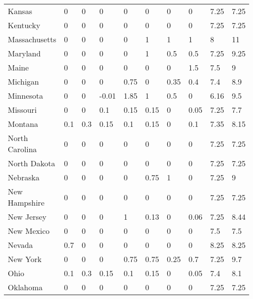 \begin{table}[H]
{{\begin{tabular}{@{}llllllllll@{}}
                Kansas         & 0    & 0    & 0     & 0    & 0    & 0    & 0    & 7.25     & 7.25   \\
                Kentucky       & 0    & 0    & 0     & 0    & 0    & 0    & 0    & 7.25     & 7.25   \\
                Massachusetts  & 0    & 0    & 0     & 0    & 1    & 1    & 1    & 8        & 11     \\
                Maryland       & 0    & 0    & 0     & 0    & 1    & 0.5  & 0.5  & 7.25     & 9.25   \\
                Maine          & 0    & 0    & 0     & 0    & 0    & 0    & 1.5  & 7.5      & 9      \\
                Michigan       & 0    & 0    & 0     & 0.75 & 0    & 0.35 & 0.4  & 7.4      & 8.9    \\
                Minnesota      & 0    & 0    & -0.01 & 1.85 & 1    & 0.5  & 0    & 6.16     & 9.5    \\
                Missouri       & 0    & 0    & 0.1   & 0.15 & 0.15 & 0    & 0.05 & 7.25     & 7.7    \\
                Montana        & 0.1  & 0.3  & 0.15  & 0.1  & 0.15 & 0    & 0.1  & 7.35     & 8.15   \\
                North Carolina & 0    & 0    & 0     & 0    & 0    & 0    & 0    & 7.25     & 7.25   \\
                North Dakota   & 0    & 0    & 0     & 0    & 0    & 0    & 0    & 7.25     & 7.25   \\
                Nebraska       & 0    & 0    & 0     & 0    & 0.75 & 1    & 0    & 7.25     & 9      \\
                New Hampshire  & 0    & 0    & 0     & 0    & 0    & 0    & 0    & 7.25     & 7.25   \\
                New Jersey     & 0    & 0    & 0     & 1    & 0.13 & 0    & 0.06 & 7.25     & 8.44   \\
                New Mexico     & 0    & 0    & 0     & 0    & 0    & 0    & 0    & 7.5      & 7.5    \\
                Nevada         & 0.7  & 0    & 0     & 0    & 0    & 0    & 0    & 8.25     & 8.25   \\
                New York       & 0    & 0    & 0     & 0.75 & 0.75 & 0.25 & 0.7  & 7.25     & 9.7    \\
                Ohio           & 0.1  & 0.3  & 0.15  & 0.1  & 0.15 & 0    & 0.05 & 7.4      & 8.1    \\
                Oklahoma       & 0    & 0    & 0     & 0    & 0    & 0    & 0    & 7.25     & 7.25   \\

\end{tabular}}}
\end{table}
